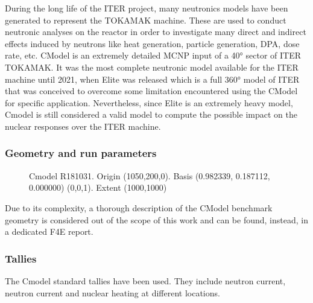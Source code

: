 \documentclass[letterpaper,10pt,english]{sphinxmanual}
\let\sphinxpxdimen\pdfpxdimen\else\newdimen\sphinxpxdimen
\begin{document}
\sphinxAtStartPar
During the long life of the ITER project, many neutronics models have been generated to represent the
TOKAMAK machine. These are used to conduct neutronic analyses on the reactor in order to investigate
many direct and indirect effects induced by neutrons like heat generation, particle generation, DPA,
dose rate, etc. C\sphinxhyphen{}Model is an extremely detailed MCNP input of a 40° sector of ITER TOKAMAK. It was
the most complete neutronic model available for the ITER machine until 2021, when E\sphinxhyphen{}lite was released
which is a full 360° model of ITER that was conceived to overcome some limitation encountered using
the C\sphinxhyphen{}Model for specific application. Nevertheless, since E\sphinxhyphen{}lite is an extremely heavy model, C\sphinxhyphen{}model
is still considered a valid model to compute the possible impact on the nuclear responses over the ITER machine.


\subsubsection{Geometry and run parameters}
\label{\detokenize{usage/benchmarks:id5}}
\begin{figure}[htbp]
\centering
\capstart

\noindent\sphinxincludegraphics[width=600\sphinxpxdimen]{{cmodel}.png}
\caption{C\sphinxhyphen{}model R181031. Origin (1050,200,0). Basis (0.982339, 0.187112, 0.000000)
(0,0,1). Extent (1000,1000)}\label{\detokenize{usage/benchmarks:id25}}\end{figure}

\sphinxAtStartPar
Due to its complexity, a thorough description of the C\sphinxhyphen{}Model benchmark geometry is considered out of
the scope of this work and can be found, instead, in a dedicated F4E report.


\subsubsection{Tallies}
\label{\detokenize{usage/benchmarks:id6}}
\sphinxAtStartPar
The C\sphinxhyphen{}model standard tallies have been used. They include neutron current,
neutron current and nuclear heating at different locations.


\nopagebreak
\end{document}
